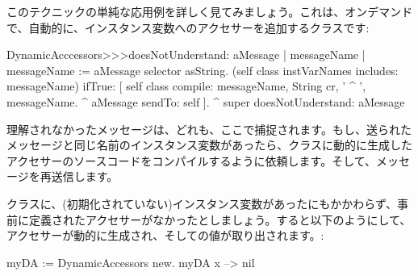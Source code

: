 \documentclass[a4paper,10pt,twoside]{book}
\begin{document}

このテクニックの単純な応用例を詳しく見てみましょう。これは、オンデマンドで、自動的に、インスタンス変数へのアクセサーを追加するクラスです: %

\begin{code}{}
DynamicAcccessors>>>doesNotUnderstand: aMessage
	| messageName |
	messageName := aMessage selector asString.
	(self class instVarNames includes: messageName)
		ifTrue: [
			self class compile: messageName, String cr, ' ^ ', messageName.
			^ aMessage sendTo: self ].
	^ super doesNotUnderstand: aMessage
\end{code}
理解されなかったメッセージは、どれも、ここで捕捉されます。もし、送られたメッセージと同じ名前のインスタンス変数があったら、クラスに動的に生成したアクセサーのソースコードをコンパイルするように依頼します。そして、メッセージを再送信します。

クラスに、(初期化されていない)インスタンス変数があったにもかかわらず、事前に定義されたアクセサーがなかったとしましょう。すると以下のようにして、アクセサーが動的に生成され、そしての値が取り出されます。:
\begin{code}{}
myDA := DynamicAccessors new.
myDA x --> nil
\end{code}
\end{document}
